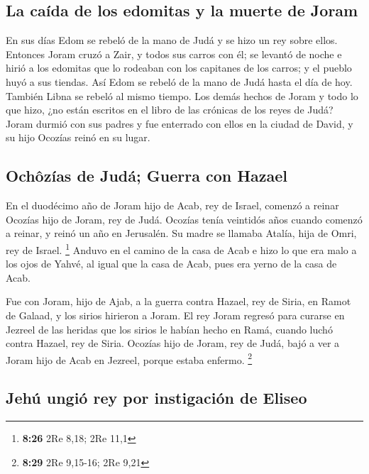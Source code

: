\hypertarget{la-cauxedda-de-los-edomitas-y-la-muerte-de-joram}{%
\subsection{La caída de los edomitas y la muerte de
Joram}\label{la-cauxedda-de-los-edomitas-y-la-muerte-de-joram}}

 En sus días Edom se rebeló de la mano de Judá y se hizo
un rey sobre ellos.  Entonces Joram cruzó a Zair, y todos
sus carros con él; se levantó de noche e hirió a los edomitas que lo
rodeaban con los capitanes de los carros; y el pueblo huyó a sus
tiendas.  Así Edom se rebeló de la mano de Judá hasta el
día de hoy. También Libna se rebeló al mismo tiempo.  Los
demás hechos de Joram y todo lo que hizo, ¿no están escritos en el libro
de las crónicas de los reyes de Judá?  Joram durmió con
sus padres y fue enterrado con ellos en la ciudad de David, y su hijo
Ocozías reinó en su lugar.

\hypertarget{ochuxf4zuxedas-de-juduxe1-guerra-con-hazael}{%
\subsection{Ochôzías de Judá; Guerra con
Hazael}\label{ochuxf4zuxedas-de-juduxe1-guerra-con-hazael}}

 En el duodécimo año de Joram hijo de Acab, rey de
Israel, comenzó a reinar Ocozías hijo de Joram, rey de Judá.
 Ocozías tenía veintidós años cuando comenzó a reinar, y
reinó un año en Jerusalén. Su madre se llamaba Atalía, hija de Omri, rey
de Israel. \footnote{\textbf{8:26} 2Re 8,18; 2Re 11,1} 
Anduvo en el camino de la casa de Acab e hizo lo que era malo a los ojos
de Yahvé, al igual que la casa de Acab, pues era yerno de la casa de
Acab.

 Fue con Joram, hijo de Ajab, a la guerra contra Hazael,
rey de Siria, en Ramot de Galaad, y los sirios hirieron a Joram.
 El rey Joram regresó para curarse en Jezreel de las
heridas que los sirios le habían hecho en Ramá, cuando luchó contra
Hazael, rey de Siria. Ocozías hijo de Joram, rey de Judá, bajó a ver a
Joram hijo de Acab en Jezreel, porque estaba enfermo. \footnote{\textbf{8:29}
  2Re 9,15-16; 2Re 9,21}

\hypertarget{jehuxfa-ungiuxf3-rey-por-instigaciuxf3n-de-eliseo}{%
\subsection{Jehú ungió rey por instigación de
Eliseo}\label{jehuxfa-ungiuxf3-rey-por-instigaciuxf3n-de-eliseo}}


